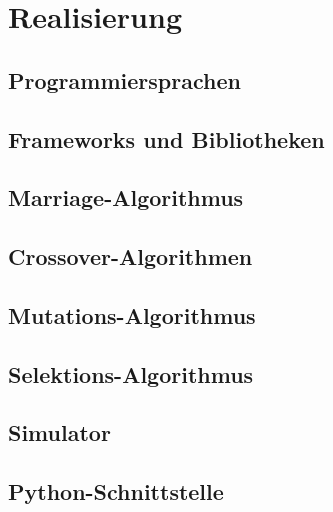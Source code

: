 
\section{Realisierung}

\subsection{Programmiersprachen}

\subsection{Frameworks und Bibliotheken}

\subsection{Marriage-Algorithmus}

\subsection{Crossover-Algorithmen}

\subsection{Mutations-Algorithmus}

\subsection{Selektions-Algorithmus}

\subsection{Simulator}

\subsection{Python-Schnittstelle}


